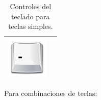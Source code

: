 \begin{table}[H]
\begin{center}
\begin{tabular}{|p{2cm}|p{10cm}|}
      \hline
      \includegraphics[width=2cm]{../imagenes/tecla_menos.png} & \vspace*{-.8in}{Disminución de velocidad. Se disminuye en una unidad la velocidad del vehículo.} \\
      \hline
    \end{tabular}
  \end{center}
\caption{Controles del teclado para teclas simples.}
\end{table}

\clearpage

Para combinaciones de teclas:\\

